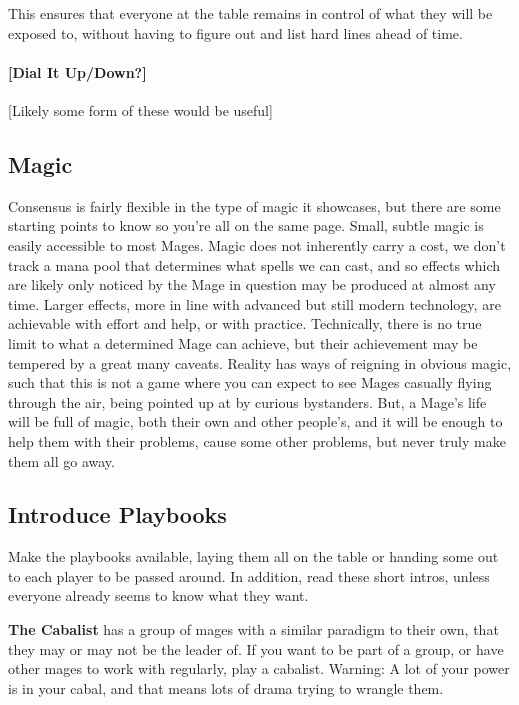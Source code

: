 \documentclass[
]{memoir}
\begin{document}
This ensures that everyone at the table remains in control of what they
will be exposed to, without having to figure out and list hard lines
ahead of time.

\hypertarget{dial-it-updown}{%
\paragraph{{[}Dial It Up/Down?{]}}\label{dial-it-updown}}

{[}Likely some form of these would be useful{]}

\hypertarget{magic}{%
\subsection{Magic}\label{magic}}

Consensus is fairly flexible in the type of magic it showcases, but
there are some starting points to know so you're all on the same page.
Small, subtle magic is easily accessible to most Mages. Magic does not
inherently carry a cost, we don't track a mana pool that determines what
spells we can cast, and so effects which are likely only noticed by the
Mage in question may be produced at almost any time. Larger effects,
more in line with advanced but still modern technology, are achievable
with effort and help, or with practice. Technically, there is no true
limit to what a determined Mage can achieve, but their achievement may
be tempered by a great many caveats. Reality has ways of reigning in
obvious magic, such that this is not a game where you can expect to see
Mages casually flying through the air, being pointed up at by curious
bystanders. But, a Mage's life will be full of magic, both their own and
other people's, and it will be enough to help them with their problems,
cause some other problems, but never truly make them all go away.

\hypertarget{introduce-playbooks}{%
\subsection{Introduce Playbooks}\label{introduce-playbooks}}

Make the playbooks available, laying them all on the table or handing
some out to each player to be passed around. In addition, read these
short intros, unless everyone already seems to know what they want.

\textbf{The Cabalist} has a group of mages with a similar paradigm to
their own, that they may or may not be the leader of. If you want to be
part of a group, or have other mages to work with regularly, play a
cabalist. Warning: A lot of your power is in your cabal, and that means
lots of drama trying to wrangle them.
\end{document}
